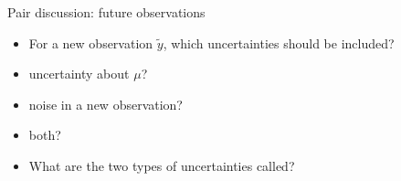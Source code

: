 \documentclass[10pt]{beamer}
\begin{document}
\begin{frame}{Pair discussion: future observations}

  \begin{itemize}
  \item For a new observation $\tilde{y}$, which uncertainties should be included?
  \item uncertainty about $\mu$?
  \item noise in a new observation?
  \item both?
  \item What are the two types of uncertainties called?
  \end{itemize}


\end{frame}
\end{document}
